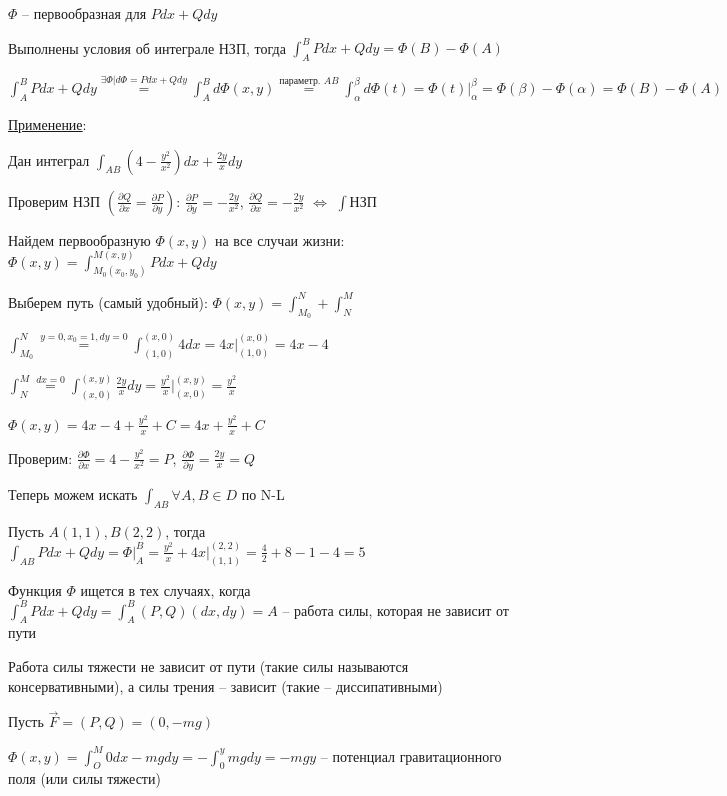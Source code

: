 \documentclass[12pt]{article}
\begin{document}
    \Nota $\Phi$ -- первообразная для $Pdx + Qdy$

    \hypertarget{theoremNewtonLeibnizforpathindependantintegral}{}

    \begin{MyTheorem}

        Выполнены условия \Ths об интеграле НЗП, тогда $\int_A^B Pdx + Qdy = \Phi(B) - \Phi(A)$
    \end{MyTheorem}

    \begin{MyProof}
        $\int_A^B Pdx + Qdy \stackrel{\exists \Phi | d\Phi = Pdx + Qdy}{=} \int_A^B d\Phi(x, y) \stackrel{\text{параметр. } AB}{=}
        \int_\alpha^\beta d\Phi(t) = \Phi(t) \Big|_\alpha^\beta = \Phi(\beta) - \Phi(\alpha) = \Phi(B) - \Phi(A)$
    \end{MyProof}

    \underline{Применение}:

    \Exs Дан интеграл $\int_{AB} \left(4 - \frac{y^2}{x^2}\right)dx + \frac{2y}{x}dy$

    Проверим НЗП $\left(\frac{\partial Q}{\partial x} = \frac{\partial P}{\partial y}\right)$: $\frac{\partial P}{\partial y} = -\frac{2y}{x^2}$, $\frac{\partial Q}{\partial x} = -\frac{2y}{x^2}$ $\Longleftrightarrow$ $\int$НЗП

    Найдем первообразную $\Phi(x, y)$ на все случаи жизни:
    $\Phi(x, y) = \int_{M_0(x_0, y_0)}^{M(x, y)} Pdx + Qdy$

    Выберем путь (самый удобный): $\Phi(x, y) = \int_{M_0}^{N} + \int_{N}^{M}$

    $\int_{M_0}^{N} \stackrel{y = 0, x_0 = 1, dy = 0}{=} \int_{(1, 0)}^{(x, 0)} 4 dx = 4x \Big|_{(1,0)}^{(x,0)} = 4x - 4$

    $\int_{N}^{M} \stackrel{dx = 0}{=} \int_{(x, 0)}^{(x, y)} \frac{2y}{x} dy = \frac{y^2}{x} \Big|_{(x,0)}^{(x,y)} = \frac{y^2}{x}$

    $\Phi(x, y) = 4x - 4 + \frac{y^2}{x} + C = 4x + \frac{y^2}{x} + C$

    Проверим: $\frac{\partial \Phi}{\partial x} = 4 - \frac{y^2}{x^2} = P$, $\frac{\partial \Phi}{\partial y} = \frac{2y}{x} = Q$

    Теперь можем искать $\int_{AB} \forall A, B \in D$ по N-L

    Пусть $A(1, 1), B(2, 2)$, тогда
    $\int_{AB} Pdx + Qdy = \Phi \Big|_A^B = \frac{y^2}{x} + 4x \Big|_{(1,1)}^{(2,2)} = \frac{4}{2} + 8 - 1 - 4 = 5$

    \Nota Функция $\Phi$ ищется в тех случаях, когда $\int_A^B Pdx + Qdy = \int^B_A (P, Q) (dx, dy) = A$ -- работа силы, которая не зависит от пути

    \Exs Работа силы тяжести не зависит от пути (такие силы называются консервативными), а силы трения -- зависит (такие -- диссипативными)

    \Ex Пусть $\vec{F} = (P, Q) = (0, -mg)$

    $\Phi(x, y) = \int_O^M 0dx - mgdy = -\int_0^y mgdy = -mgy$ -- потенциал гравитационного поля (или силы тяжести)
\end{document}
